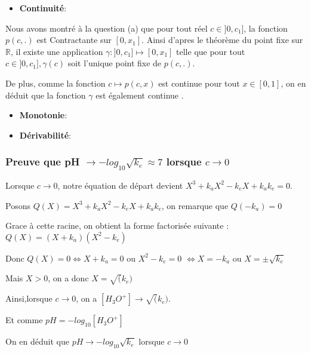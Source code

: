 \documentclass[11pt]{article}
\providecommand{\tightlist}{%
      \setlength{\itemsep}{0pt}\setlength{\parskip}{0pt}}
\begin{document}
\begin{itemize}
\tightlist
\item
  \textbf{Continuité}:
\end{itemize}

Nous avons montré à la question (a) que pour tout réel
\(c \in ]0,c_1]\), la fonction \(p(c,.)\) est Contractante sur
\([0,x_1]\). Ainsi d'apres le théorème du point fixe sur \(\mathbb{R}\),
il existe une application \(\gamma :]0,c_1]\longmapsto [0,x_1]\) telle
que pour tout \(c\in ]0,c_1], \gamma (c)\) soit l'unique point fixe de
\(p(c,.)\).

De plus, comme la fonction \(c \longmapsto p(c,x)\) est continue pour
tout \(x\in [0,1]\), on en déduit que la fonction \(\gamma\) est
également continue .

\begin{itemize}
\item
  \textbf{Monotonie}:
\item
  \textbf{Dérivabilité}:
\end{itemize}

    \hypertarget{preuve-que-ph-longrightarrow--log_10sqrtk_eapprox-7-lorsque-clongrightarrow-0}{%
\subsubsection{\texorpdfstring{\textbf{Preuve que pH
\(\longrightarrow -log_{10}\sqrt{k_e}\approx 7\) lorsque
\(c\longrightarrow 0\)}}{Preuve que pH \textbackslash{}longrightarrow -log\_\{10\}\textbackslash{}sqrt\{k\_e\}\textbackslash{}approx 7 lorsque c\textbackslash{}longrightarrow 0}}\label{preuve-que-ph-longrightarrow--log_10sqrtk_eapprox-7-lorsque-clongrightarrow-0}}

    Lorsque \(c\longrightarrow 0\), notre équation de départ devient
\(X^3+k_{a}X^2-k_{e}X+k_ak_e=0\).

Posons \(Q(X)=X^3+k_{a}X^2-k_{e}X+k_ak_e\), on remarque que
\(Q(-k_a)=0\)

Grace à cette racine, on obtient la forme factorisée suivante :
\(Q(X)= (X+k_a)(X^2-k_e)\)

Donc \(Q(X)=0 \iff X+k_a=0\) ou \(X^2-k_e=0\) \(\iff X=-k_a\) ou
\(X= \pm \sqrt{k_e}\)

Mais \(X>0\), on a donc \(X = \sqrt(k_e)\)

Ainsi,lorsque \(c\longrightarrow 0\), on a
\([H_3O^+] \longrightarrow \sqrt(k_e)\).

Et comme \(pH = -log_{10}[H_3O^+]\)

On en déduit que \(pH \longrightarrow -log_{10}\sqrt{k_e}\) lorsque
\(c\longrightarrow 0\)
\end{document}
